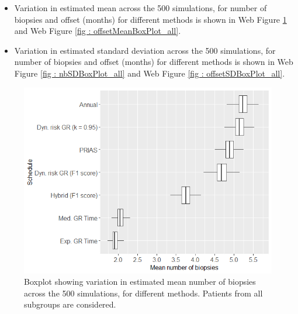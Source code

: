 \begin{itemize}
  \item Variation in estimated mean across the 500 simulations, for number of biopsies and offset (months) for different methods is shown in Web Figure \ref{fig : nbMeanBoxPlot_all} and Web Figure \ref{fig : offsetMeanBoxPlot_all}.
  \item Variation in estimated standard deviation across the 500 simulations, for number of biopsies and offset (months) for different methods is shown in Web Figure \ref{fig : nbSDBoxPlot_all} and Web Figure \ref{fig : offsetSDBoxPlot_all}.
\end{itemize}

\begin{figure}[!htb]
\centerline{\includegraphics[width=\columnwidth]{images/sim_study/nbMeanBoxPlot_all.png}}
\caption{Boxplot showing variation in estimated mean number of biopsies across the 500 simulations, for different methods. Patients from all subgroups are considered.}
\label{fig : nbMeanBoxPlot_all}
\end{figure}

